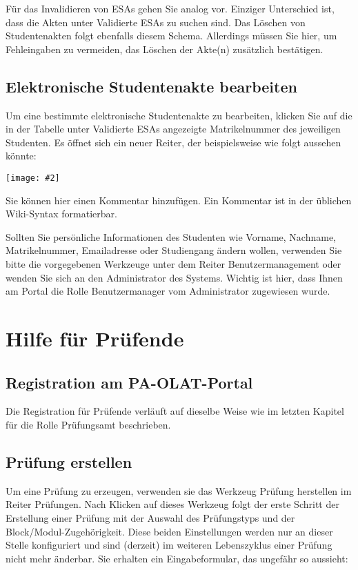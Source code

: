 \documentclass[a4paper,11pt]{article}
\newcommand{\bild}[2]{
    \begin{center}\texttt{[image: \#2]}\end{center}
}
\newcommand{\knopf}[1]{{\sc #1}}
\begin{document}
Für das Invalidieren von ESAs gehen Sie analog vor. Einziger Unterschied ist,
dass die Akten unter \knopf{Validierte ESAs} zu suchen sind.  Das Löschen von
Studentenakten folgt ebenfalls diesem Schema. Allerdings müssen Sie hier, um
Fehleingaben zu vermeiden, das Löschen der Akte(n) zusätzlich bestätigen.

\subsection{Elektronische Studentenakte bearbeiten}

Um eine bestimmte elektronische Studentenakte zu bearbeiten, klicken Sie auf
die in der Tabelle unter \knopf{Validierte ESAs} angezeigte Matrikelnummer des
jeweiligen Studenten. Es öffnet sich ein neuer Reiter, der beispielsweise wie
folgt aussehen könnte:

\bild{.9}{ESA-Edit}

Sie können hier einen \knopf{Kommentar hinzufügen}. Ein Kommentar ist in der
üblichen Wiki-Syntax formatierbar.

Sollten Sie persönliche Informationen des Studenten wie Vorname, Nachname,
Matrikelnummer, Emailadresse oder Studiengang ändern wollen, verwenden Sie
bitte die vorgegebenen Werkzeuge unter dem Reiter \knopf{Benutzermanagement}
oder wenden Sie sich an den Administrator des Systems. Wichtig ist hier, dass
Ihnen am Portal die Rolle Benutzermanager vom Administrator zugewiesen wurde.

\clearpage
\section{Hilfe für Prüfende}

\subsection{Registration am PA-OLAT-Portal}

Die Registration für Prüfende verläuft auf dieselbe Weise wie im letzten
Kapitel für die Rolle Prüfungsamt beschrieben.

\subsection{Prüfung erstellen}

Um eine Prüfung zu erzeugen, verwenden sie das Werkzeug \knopf{Prüfung
  herstellen} im Reiter \knopf{Prüfungen}. Nach Klicken auf dieses Werkzeug
folgt der erste Schritt der Erstellung einer Prüfung mit der Auswahl des
Prüfungstyps und der Block/Modul-Zugehörigkeit. Diese beiden Einstellungen
werden nur an dieser Stelle konfiguriert und sind (derzeit) im weiteren
Lebenszyklus einer Prüfung nicht mehr änderbar. Sie erhalten ein
Eingabeformular, das ungefähr so aussieht:
\end{document}

